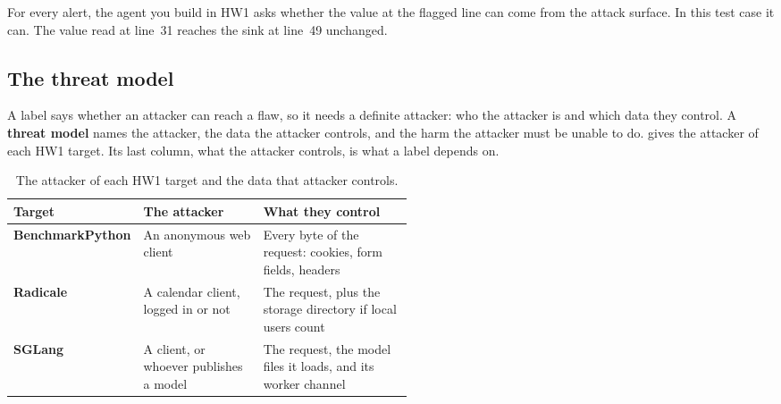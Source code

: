 For every alert, the agent you build in HW1 asks whether the value at the flagged line can come from
the attack surface. In this test case it can. The value read at line~31 reaches the sink at line~49
unchanged.

\subsection{The threat model}
\label{sec:discovery-threat}

A label says whether an attacker can reach a flaw, so it needs a definite attacker: who the attacker
is and which data they control. A \textbf{threat model} names the attacker, the data the attacker
controls, and the harm the attacker must be unable to do.  gives the
attacker of each HW1 target. Its last column, what the attacker controls, is what a label depends on.

\begin{table}[htbp]
  \caption{The attacker of each HW1 target and the data that attacker controls.}
  \label{tab:discovery-threat}
  \begin{adjustbox}{width=\linewidth}\begin{tabularx}{\linewidth}{L{0.22\linewidth}L{0.3\linewidth}X}
    \toprule
    \textbf{Target} & \textbf{The attacker} & \textbf{What they control} \\
    \midrule
    \textbf{Benchmark\-Python} & An anonymous web client & Every byte of the request: cookies, form fields, headers \\
    \textbf{Radicale} & A calendar client, logged in or not & The request, plus the storage directory if local users count \\
    \textbf{SGLang} & A client, or whoever publishes a model & The request, the model files it loads, and its worker channel \\
    \bottomrule
  \end{tabularx}\end{adjustbox}
\end{table}

